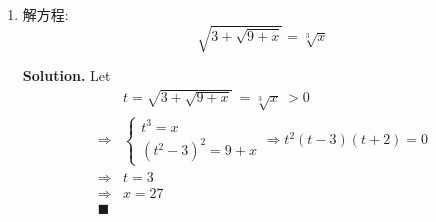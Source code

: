 \documentclass[UTF8]{article}
\begin{document}
\begin{enumerate}
        \item 解方程: $$ \sqrt{3+\sqrt{9+x}} = \sqrt[3]{x} $$

        \noindent \textbf{Solution. }  Let
        \begin{align*}
           & t = \sqrt{3 + \sqrt{9+x}} \  = \sqrt[3]{x} \ > 0  \\
            \Longrightarrow &
            \left \{
                \begin{aligned}
                t^3 = x \\
                (t^2 - 3)^2 = 9 + x
                \end{aligned}
                \Longrightarrow t^2(t-3)(t+2) = 0
            \right. \\
            \Longrightarrow & t = 3 \\
            \Longrightarrow & x = 27 \\
            \blacksquare 
        \end{align*}


    \end{enumerate}
\end{document}
